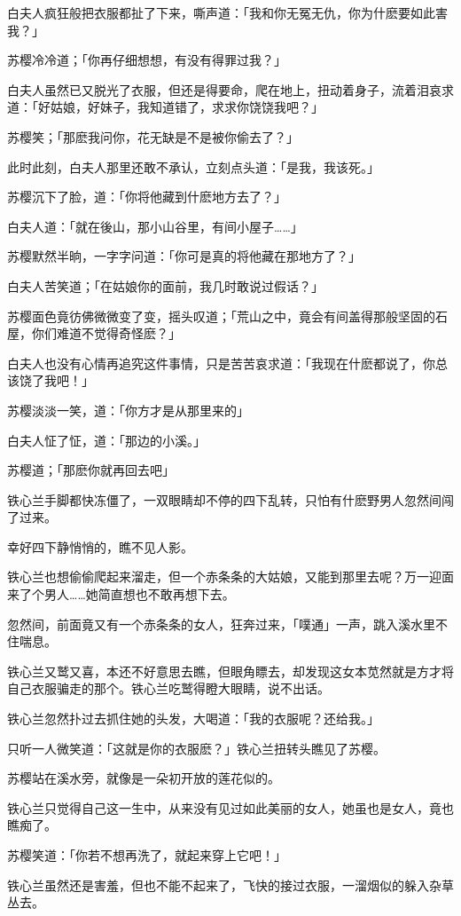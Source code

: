 \documentclass[12pt,oneside]{book}
\begin{document}
白夫人疯狂般把衣服都扯了下来，嘶声道：「我和你无冤无仇，你为什麽要如此害我？」

苏樱冷冷道；「你再仔细想想，有没有得罪过我？」

白夫人虽然已又脱光了衣服，但还是得要命，爬在地上，扭动着身子，流着泪哀求道：「好姑娘，好妹子，我知道错了，求求你饶饶我吧？」

苏樱笑；「那麽我问你，花无缺是不是被你偷去了？」

此时此刻，白夫人那里还敢不承认，立刻点头道：「是我，我该死。」

苏樱沉下了脸，道：「你将他藏到什麽地方去了？」

白夫人道：「就在後山，那小山谷里，有间小屋子\ldots\ldots」

苏樱默然半晌，一字字问道：「你可是真的将他藏在那地方了？」

白夫人苦笑道；「在姑娘你的面前，我几时敢说过假话？」

苏樱面色竟彷佛微微变了变，摇头叹道；「荒山之中，竟会有间盖得那般坚固的石屋，你们难道不觉得奇怪麽？」

白夫人也没有心情再追究这件事情，只是苦苦哀求道：「我现在什麽都说了，你总该饶了我吧！」

苏樱淡淡一笑，道：「你方才是从那里来的」

白夫人怔了怔，道：「那边的小溪。」

苏樱道；「那麽你就再回去吧」

铁心兰手脚都快冻僵了，一双眼睛却不停的四下乱转，只怕有什麽野男人忽然间闯了过来。

幸好四下静悄悄的，瞧不见人影。

铁心兰也想偷偷爬起来溜走，但一个赤条条的大姑娘，又能到那里去呢？万一迎面来了个男人\ldots\ldots 她简直想也不敢再想下去。

忽然间，前面竟又有一个赤条条的女人，狂奔过来，「噗通」一声，跳入溪水里不住喘息。

铁心兰又鹫又喜，本还不好意思去瞧，但眼角瞟去，却发现这女本苋然就是方才将自己衣服骗走的那个。铁心兰吃鹫得瞪大眼睛，说不出话。

铁心兰忽然扑过去抓住她的头发，大喝道：「我的衣服呢？还给我。」

只听一人微笑道：「这就是你的衣服麽？」铁心兰扭转头瞧见了苏樱。

苏樱站在溪水旁，就像是一朵初开放的莲花似的。

铁心兰只觉得自己这一生中，从来没有见过如此美丽的女人，她虽也是女人，竟也瞧痴了。

苏樱笑道：「你若不想再洗了，就起来穿上它吧！」

铁心兰虽然还是害羞，但也不能不起来了，飞快的接过衣服，一溜烟似的躲入杂草丛去。
\end{document}
